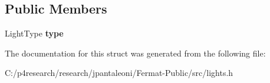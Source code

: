 \subsection*{Public Members}
\begin{DoxyCompactItemize}
\item 
\mbox{\label{struct_light_a86e648b4a80a5c1e194c97ef52f9efc6}} 
Light\+Type {\bfseries type}
\end{DoxyCompactItemize}


The documentation for this struct was generated from the following file\+:\begin{DoxyCompactItemize}
\item 
C\+:/p4research/research/jpantaleoni/\+Fermat-\/\+Public/src/lights.\+h\end{DoxyCompactItemize}
